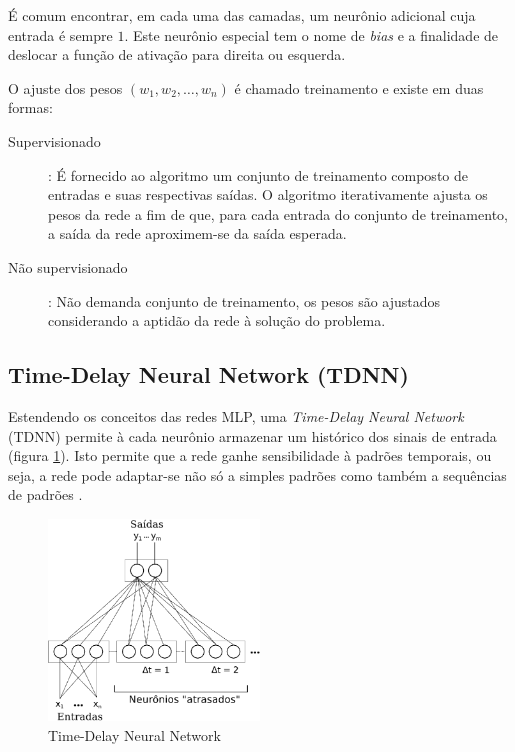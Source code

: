É comum encontrar, em cada uma das camadas, um neurônio adicional cuja entrada é sempre \(1\). Este neurônio especial tem o nome de \textit{bias} e a finalidade de deslocar a função de ativação para direita ou esquerda.

O ajuste dos pesos \((w_1, w_2, \dots , w_n)\) é chamado treinamento e existe em duas formas:

\begin{description}
    \item[Supervisionado]: É fornecido ao algoritmo um conjunto de treinamento composto de entradas e suas respectivas saídas. O algoritmo iterativamente ajusta os pesos da rede a fim de que, para cada entrada do conjunto de treinamento, a saída da rede aproximem-se da saída esperada.
    \item[Não supervisionado]: Não demanda conjunto de treinamento, os pesos são ajustados considerando a aptidão da rede à solução do problema.
\end{description}

\subsection{Time-Delay Neural Network (TDNN)}
\label{sec:tdnn}

Estendendo os conceitos das redes MLP, uma \textit{Time-Delay Neural Network} (TDNN) permite à cada neurônio armazenar um histórico dos sinais de entrada (figura \ref{fig:tdnn}). Isto permite que a rede ganhe sensibilidade à padrões temporais, ou seja, a rede pode adaptar-se não só a simples padrões como também a sequências de padrões \cite{kaiser1994tdnn}.

\begin{figure}[H]
    \centering
    \includegraphics[width=0.5\textwidth]{figures/tdnn}
    \caption{Time-Delay Neural Network}
    \label{fig:tdnn}
\end{figure}

